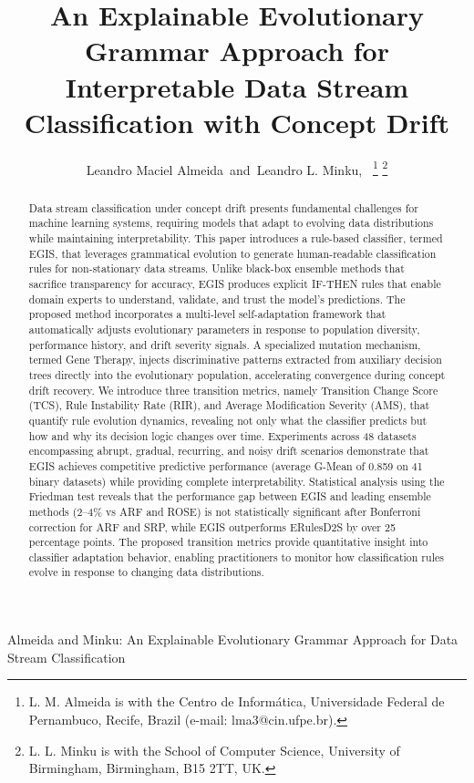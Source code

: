 \documentclass[lettersize,journal]{IEEEtran}
\begin{document}
\title{An Explainable Evolutionary Grammar Approach for Interpretable Data Stream Classification with Concept Drift}

\author{Leandro Maciel Almeida~and~Leandro L. Minku,~
\thanks{L. M. Almeida is with the Centro de Inform\'{a}tica, Universidade Federal de Pernambuco, Recife, Brazil (e-mail: lma3@cin.ufpe.br).}
\thanks{L. L. Minku is with the School of Computer Science, University of Birmingham, Birmingham, B15 2TT, UK.}}

%
{Almeida and Minku: An Explainable Evolutionary Grammar Approach for Data Stream Classification}

\maketitle

\begin{abstract}
Data stream classification under concept drift presents fundamental challenges for machine learning systems, requiring models that adapt to evolving data distributions while maintaining interpretability. This paper introduces a rule-based classifier, termed EGIS, that leverages grammatical evolution to generate human-readable classification rules for non-stationary data streams. Unlike black-box ensemble methods that sacrifice transparency for accuracy, EGIS produces explicit IF-THEN rules that enable domain experts to understand, validate, and trust the model's predictions. The proposed method incorporates a multi-level self-adaptation framework that automatically adjusts evolutionary parameters in response to population diversity, performance history, and drift severity signals. A specialized mutation mechanism, termed Gene Therapy, injects discriminative patterns extracted from auxiliary decision trees directly into the evolutionary population, accelerating convergence during concept drift recovery. We introduce three transition metrics, namely Transition Change Score (TCS), Rule Instability Rate (RIR), and Average Modification Severity (AMS), that quantify rule evolution dynamics, revealing not only what the classifier predicts but how and why its decision logic changes over time. Experiments across 48 datasets encompassing abrupt, gradual, recurring, and noisy drift scenarios demonstrate that EGIS achieves competitive predictive performance (average G-Mean of 0.859 on 41 binary datasets) while providing complete interpretability. Statistical analysis using the Friedman test reveals that the performance gap between EGIS and leading ensemble methods (2--4\% vs ARF and ROSE) is not statistically significant after Bonferroni correction for ARF and SRP, while EGIS outperforms ERulesD2S by over 25 percentage points. The proposed transition metrics provide quantitative insight into classifier adaptation behavior, enabling practitioners to monitor how classification rules evolve in response to changing data distributions.
\end{abstract}
\end{document}
